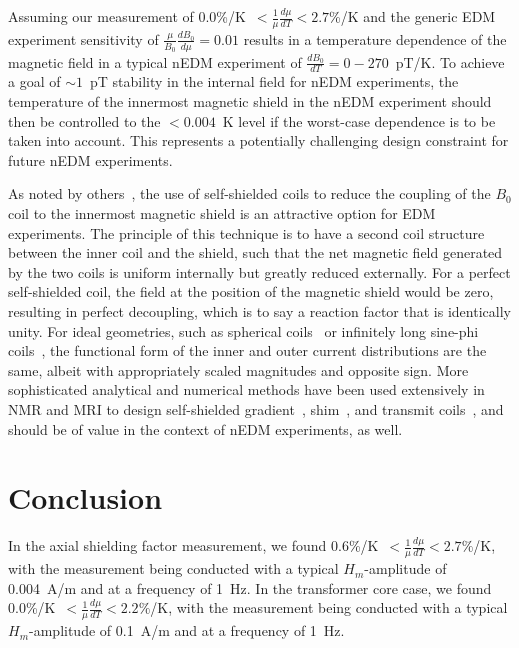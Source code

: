 Assuming our measurement of
0.0\%/K~$<\frac{1}{\mu}\frac{d\mu}{dT}<2.7$\%/K and the generic EDM
experiment sensitivity of $\frac{\mu}{B_0}\frac{dB_0}{d\mu}=0.01$
results in a temperature dependence of the magnetic field in a typical
nEDM experiment of $\frac{dB_0}{dT}=0-270$~pT/K.  To achieve a goal of
$\sim 1$~pT stability in the internal field for nEDM experiments, the
temperature of the innermost magnetic shield in the nEDM experiment
should then be controlled to the $<0.004$~K level if the worst-case
dependence is to be taken into account.  This represents a potentially
challenging design constraint for future nEDM experiments.

As noted by others~\cite{khriplovich1997cp}, the use of
self-shielded coils to reduce the coupling of the $B_0$ coil to the
innermost magnetic shield is an attractive option for EDM experiments.
The principle of this technique is to have a second coil structure
between the inner coil and the shield, such that the net magnetic
field generated by the two coils is uniform internally but greatly
reduced externally.  For a perfect self-shielded coil, the field at
the position of the magnetic shield would be zero, resulting in
perfect decoupling, which is to say a reaction factor that is
identically unity.  For ideal geometries, such as spherical
coils~\cite{brown1945fluxball, wheeler1958spherical,purcell1989} or infinitely long
sine-phi coils~\cite{bethBNL,bethUSpatent,bidinosti2005}, the
functional form of the inner and outer current distributions are the
same, albeit with appropriately scaled magnitudes and opposite sign.
More sophisticated analytical and numerical methods have been used
extensively in NMR and MRI to design self-shielded
gradient~\cite{turner1986,hidalgo},
shim~\cite{brideson,forbes}, and transmit
coils~\cite{bidinosti2005,kuzmin}, and should be of value in the
context of nEDM experiments, as well.


\section{Conclusion}

In the axial shielding factor measurement, we found
0.6\%/K~$<\frac{1}{\mu}\frac{d\mu}{dT}<2.7\%$/K, with the measurement
being conducted with a typical $H_m$-amplitude of 0.004~A/m and at a
frequency of 1~Hz.  In the transformer core case, we found
0.0\%/K~$<\frac{1}{\mu}\frac{d\mu}{dT}<2.2\%$/K, with the measurement
being conducted with a typical $H_m$-amplitude of 0.1~A/m and at a
frequency of 1~Hz.

